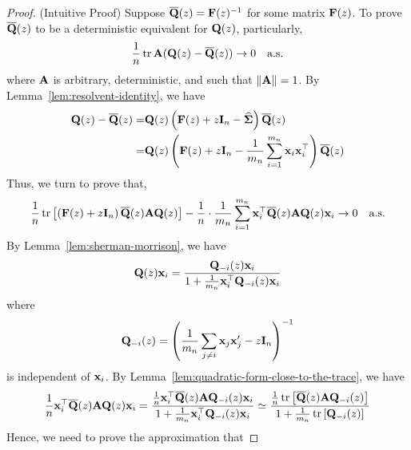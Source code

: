 \begin{proof}
	(Intuitive Proof) Suppose $\overline{{\bf Q}}(z)={\bf F}(z)^{-1}$ for some matrix ${\bf F}(z)$. To prove $\overline{{\bf Q}}(z)$ to be a deterministic equivalent for ${\bf Q}(z)$, particularly,
	\begin{equation*}
		\frac{1}{n}\operatorname{tr}{\bf A}({\bf Q}(z)-\overline{{\bf Q}}(z))\rightarrow 0\quad\text{a.s.}
	\end{equation*}
	where ${\bf A}$ is arbitrary, deterministic, and such that $\|{\bf A}\|=1$. By Lemma~\ref{lem:resolvent-identity}, we have
	\begin{equation*}
		\begin{aligned}
			{\bf Q}(z)-\overline{{\bf Q}}(z)= & {\bf Q}(z)\left({\bf F}(z)+z\mathbf{I}_{n}-\widehat{\boldsymbol{\Sigma}}\right) \overline{{\bf Q}}(z)                                      \\
			=                           & {\bf Q}(z)\left({\bf F}(z)+z\mathbf{I}_{n}-\frac{1}{m_{n}}\sum_{i=1}^{m_{n}}{\bf x}_{i}{\bf x}_{i}^{\top}\right)\overline{{\bf Q}}(z)
		\end{aligned}
	\end{equation*}
	Thus, we turn to prove that,
	\begin{equation*}
		\frac{1}{n}\operatorname{tr}\left[\left({\bf F}(z)+z\mathbf{I}_{n}\right)\overline{{\bf Q}}(z){\bf A}{\bf Q}(z)\right]-\frac{1}{n}\cdot\frac{1}{m_{n}}\sum_{i=1}^{m_{n}}{\bf x}_{i}^{\top}\overline{{\bf Q}}(z){\bf A}{\bf Q}(z){\bf x}_{i}\rightarrow 0\quad\text{a.s.}
	\end{equation*}
	By Lemma~\ref{lem:sherman-morrison}, we have
	\begin{equation*}
		{\bf Q}(z){\bf x}_{i}=\frac{{\bf Q}_{-i}(z){\bf x}_{i}}{1+\frac{1}{m_{n}}{\bf x}_{i}^{\top}{\bf Q}_{-i}(z){\bf x}_{i}}
	\end{equation*}
	where
	\begin{equation*}
		{\bf Q}_{-i}(z)=\left(\frac{1}{m_{n}}\sum_{j\neq i}{\bf x}_{j}{\bf x}_{j}^{\prime}-z\mathbf{I}_{n}\right)^{-1}
	\end{equation*}
	is independent of ${\bf x}_{i}$. By Lemma~\ref{lem:quadratic-form-close-to-the-trace}, we have
	\begin{equation*}
		\frac{1}{n}{\bf x}_{i}^{\top}\overline{{\bf Q}}(z){\bf A}{\bf Q}(z){\bf x}_{i}=\frac{\frac{1}{n}{\bf x}_{i}^{\top}\overline{{\bf Q}}(z){\bf A}{\bf Q}_{-i}(z){\bf x}_{i}}{1+\frac{1}{m_{n}}{\bf x}_{i}^{\top}{\bf Q}_{-i}(z){\bf x}_{i}}\simeq\frac{\frac{1}{n}\operatorname{tr}\left[\overline{{\bf Q}}(z){\bf A}{\bf Q}_{-i}(z)\right]}{1+\frac{1}{m_{n}}\operatorname{tr}\left[{\bf Q}_{-i}(z)\right]}
	\end{equation*}
	Hence, we need to prove the approximation that

\end{proof}
